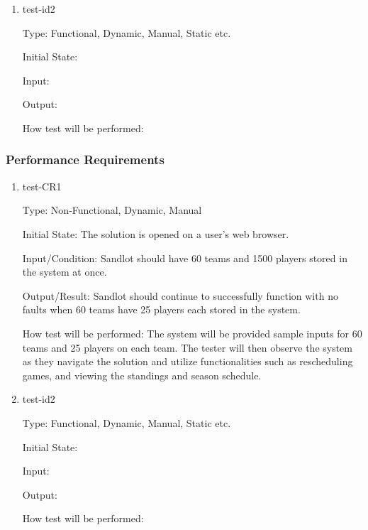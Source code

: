 \documentclass[12pt, titlepage]{article}
\begin{document}
\begin{enumerate}

  \item{test-id2\\}
  
  Type: Functional, Dynamic, Manual, Static etc.
            
  Initial State: 
            
  Input: 
            
  Output: 
            
  How test will be performed:
  
  \end{enumerate}

\subsubsection{Performance Requirements}

\begin{enumerate}

  \item{test-CR1\\}
  
  Type: Non-Functional, Dynamic, Manual
            
  Initial State: The solution is opened on a user's web browser.
            
  Input/Condition: Sandlot should have 60 teams and 1500 players stored in the system at
  once.
            
  Output/Result: Sandlot should continue to successfully function with no faults when
  60 teams have 25 players each stored in the system.
            
  How test will be performed: The system will be provided sample inputs for 60 teams and
  25 players on each team. The tester will then observe the system as they navigate the
  solution and utilize functionalities such as rescheduling games, and viewing the standings
  and season schedule.

            
  \item{test-id2\\}
  
  Type: Functional, Dynamic, Manual, Static etc.
            
  Initial State: 
            
  Input: 
            
  Output: 
            
  How test will be performed: 
  
  \end{enumerate}
\end{document}
